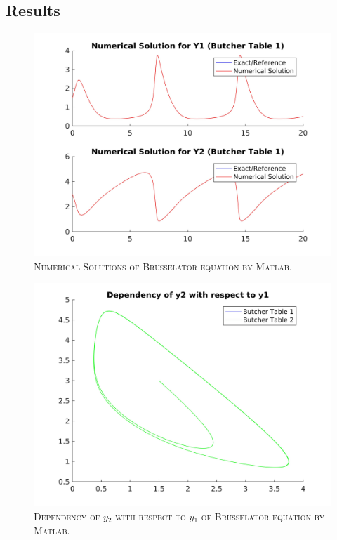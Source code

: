 \documentclass[a4paper,oneside]{book}
\numberwithin{equation}{chapter}
\begin{document}
\subsection{Results}
\begin{figure}[H]
\centering
\includegraphics[scale=0.09]{1ns1}
\caption{\textsc{Numerical Solutions of Brusselator equation by Matlab.}}
\end{figure}
\begin{figure}[H]
\centering
\includegraphics[scale=0.09]{1d}
\caption{\textsc{Dependency of $y_2$ with respect to $y_1$ of Brusselator equation by Matlab.}}
\end{figure}
\end{document}
